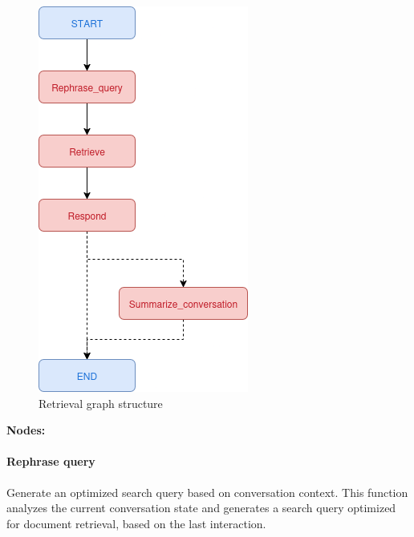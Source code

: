 \documentclass[11pt,a4paper]{report}
\begin{document}
\begin{figure}[H]
    \centering
    \includegraphics[width=0.4\linewidth]{static/schemas/retrievalGraph.drawio.png}
    \caption{Retrieval graph structure}
    \label{fig:retrievalGraph}
\end{figure}

\textbf{Nodes:}\\

\paragraph{Rephrase query}

Generate an optimized search query based on conversation context.  This function analyzes the current conversation state and generates a search query optimized for document retrieval, based on the last interaction.
\end{document}
